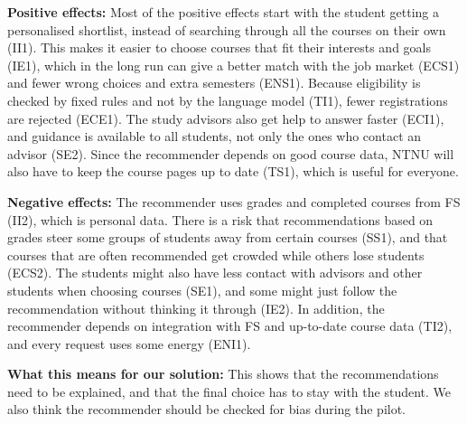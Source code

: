 \textbf{Positive effects:} Most of the positive effects start with the student getting a personalised shortlist, instead of searching through all the courses on their own (II1). This makes it easier to choose courses that fit their interests and goals (IE1), which in the long run can give a better match with the job market (ECS1) and fewer wrong choices and extra semesters (ENS1). Because eligibility is checked by fixed rules and not by the language model (TI1), fewer registrations are rejected (ECE1). The study advisors also get help to answer faster (ECI1), and guidance is available to all students, not only the ones who contact an advisor (SE2). Since the recommender depends on good course data, NTNU will also have to keep the course pages up to date (TS1), which is useful for everyone.

\textbf{Negative effects:} The recommender uses grades and completed courses from FS (II2), which is personal data. There is a risk that recommendations based on grades steer some groups of students away from certain courses (SS1), and that courses that are often recommended get crowded while others lose students (ECS2). The students might also have less contact with advisors and other students when choosing courses (SE1), and some might just follow the recommendation without thinking it through (IE2). In addition, the recommender depends on integration with FS and up-to-date course data (TI2), and every request uses some energy (ENI1).

\textbf{What this means for our solution:} This shows that the recommendations need to be explained, and that the final choice has to stay with the student. We also think the recommender should be checked for bias during the pilot.


